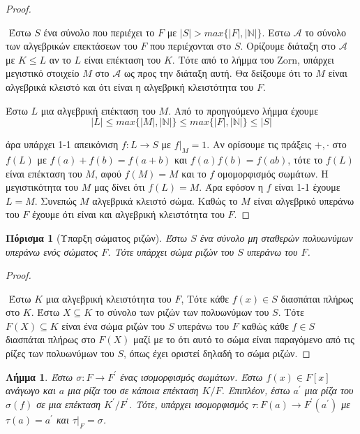 \documentclass[oneside,a4paper]{article}
\newtheorem{lemma}{Λήμμα}
\newtheorem{cor}{Πόρισμα}
\newcommand {\tl}{\textlatin}
\begin{document}
\begin{proof} $ $
	
	$ $\newline
	Έστω $S$ ένα σύνολο που περιέχει το $F$ με $|S| > max\{|F|,|\mathbb N|\}$. Εστω $\mathcal A$ το σύνολο των αλγεβρικών επεκτάσεων του $F$ που περιέχονται στο $S$. Ορίζουμε διάταξη στο $\mathcal A$ με $K\leq L$ αν το $L$ είναι επέκταση του $K$. Τότε από το λήμμα του \tl{Zorn}, υπάρχει μεγιστικό στοιχείο $M$ στο $\mathcal A$ ως προς την διάταξη αυτή. Θα δείξουμε ότι το $M$ είναι αλγεβρικά κλειστό και ότι είναι η αλγεβρική κλειστότητα του $F$.

	Έστω $L$ μια αλγεβρική επέκταση του $M$. Από το προηγούμενο λήμμα έχουμε
	$$|L| \leq max\{|M|,|\mathbb N|\} \leq max\{|F|,|\mathbb N|\} \leq |S|$$

	άρα υπάρχει 1-1 απεικόνιση $f:L \rightarrow S$ με $f|_M = 1$. Αν ορίσουμε τις πράξεις $+,\cdot$ στο $f(L)$ με $f(a)+f(b) = f(a+b)$ και $f(a)f(b) = f(ab)$, τότε το $f(L)$ είναι επέκταση του $M$, αφού $f(M) = M$ και το $f$ ομομορφισμός σωμάτων. Η μεγιστικότητα του $M$ μας δίνει ότι $f(L) = M$. Άρα εφόσον η $f$ είναι 1-1 έχουμε $L = M$. Συνεπώς $M$ αλγεβρικά κλειστό σώμα. Καθώς το $M$ είναι αλγεβρικό υπεράνω του $F$ έχουμε ότι είναι και αλγεβρική κλειστότητα του $F$.	
\end{proof}


\begin{cor}[Υπαρξη σώματος ριζών]
	Έστω $S$ ένα σύνολο μη σταθερών πολυωνύμων υπεράνω ενός σώματος $F$. Τότε υπάρχει σώμα ριζών του $S$ υπεράνω του $F$.
\end{cor}

\begin{proof} $ $

	$ $\newline
	Έστω $K$ μια αλγεβρική κλειστότητα του $F$, Τότε κάθε $f(x) \in S$ διασπάται πλήρως στο $K$. Έστω $X\subseteq K$ το σύνολο των ριζών των πολυωνύμων του $S$. Τότε $F(X) \subseteq K$ είναι ένα σώμα ριζών του $S$ υπεράνω του $F$ καθώς κάθε $f \in S$ διασπάται πλήρως στο $F(X)$ μαζί με το ότι αυτό το σώμα είναι παραγόμενο από τις ρίζες των πολυωνύμων του $S$, όπως έχει οριστεί δηλαδή το σώμα ριζών.
\end{proof}

\begin{lemma} Έστω $\sigma : F \rightarrow F^{\prime}$ ένας ισομορφισμός σωμάτων. Έστω $f(x) \in F[x]$ ανάγωγο και $a$ μια ρίζα του σε κάποια επέκταση $K/F$. Επιπλέον, έστω $a^{\prime}$ μια ρίζα του $\sigma(f)$ σε μια επέκταση $K^{\prime} / F^{\prime}$. Τότε, υπάρχει ισομορφισμός $\tau : F(a) \rightarrow F^{\prime} ( a ^{\prime})$ με $\tau (a) = a^{\prime}$ και $\tau|_F = \sigma$.
\end{lemma}
\end{document}
